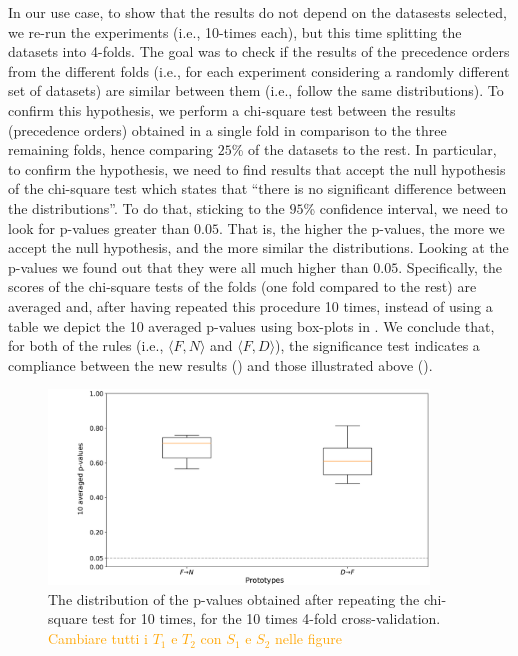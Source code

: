 
\begin{example}
In our use case, to show that the results do not depend on the datasests selected, we re-run the experiments (i.e., 10-times each), but this time splitting the datasets into 4-folds.
The goal was to check if the results of the precedence orders from the different folds (i.e., for each experiment considering a randomly different set of datasets) are similar between them (i.e., follow the same distributions).
To confirm this hypothesis, we perform a chi-square test between the results (precedence orders) obtained in a single fold in comparison to the three remaining folds, hence comparing $25$\% of the datasets to the rest.
In particular, to confirm the hypothesis, we need to find results that accept the null hypothesis of the chi-square test which states that ``there is no significant difference between the distributions''.
To do that, sticking to the $95$\% confidence interval, we need to look for p-values greater than $0.05$.
That is, the higher the p-values, the more we accept the null hypothesis, and the more similar the distributions.
Looking at the p-values we found out that they were all much higher than $0.05$.
Specifically, the scores of the chi-square tests of the folds (one fold compared to the rest) are averaged and, after having repeated this procedure 10 times, instead of using a table we depict the 10 averaged p-values using box-plots in .
We conclude that, for both of the rules (i.e.,  $\langle F, N \rangle$ and $\langle F, D \rangle$), the significance test indicates a compliance between the new results () and those illustrated above ().

\begin{figure}[!t]
	\centering
	\includegraphics[width=0.9\textwidth]{chapters/data-centric/supervised/img/10_times_4_folds_cv.pdf}
	\caption{The distribution of the p-values obtained after repeating the chi-square test for 10 times, for the 10 times 4-fold cross-validation. \textcolor{orange}{Cambiare tutti i $T_1$ e $T_2$ con $S_1$ e $S_2$ nelle figure}}
	\label{fig:10-times-4-cv}
\end{figure}


\end{example}
